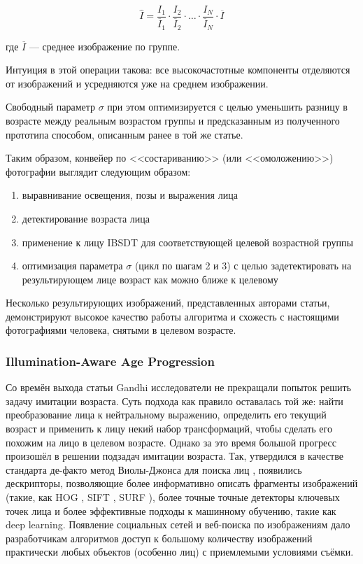 $$
\widehat{I} = \frac {I_1} {\overline{I}_1} \cdot \frac {I_2} {\overline{I}_2}  \cdot \ldots \cdot \frac {I_N} {\overline{I}_N} \cdot \overline{I}
$$

где $ \overline{I} $ --- среднее изображение по группе.

Интуиция в этой операции такова: все высокочастотные компоненты отделяются от изображений и усредняются уже на среднем изображении.

Свободный параметр $ \sigma $ при этом оптимизируется с целью уменьшить разницу в возрасте между реальным возрастом группы и предсказанным из полученного прототипа способом, описанным ранее в той же статье.

Таким образом, конвейер по <<состариванию>> (или <<омоложению>>) фотографии выглядит следующим образом:
\begin{enumerate}
	\item выравнивание освещения, позы и выражения лица
	\item детектирование возраста лица
	\item применение к лицу IBSDT для соответствующей целевой возрастной группы
	\item оптимизация параметра $ \sigma $ (цикл по шагам 2 и 3) с целью задетектировать на результирующем лице возраст как можно ближе к целевому
\end{enumerate}

Несколько результирующих изображений, представленных авторами статьи, демонстрируют высокое качество работы алгоритма и схожесть с настоящими фотографиями человека, снятыми в целевом возрасте.

\subsubsection{Illumination-Aware Age Progression}

Со времён выхода статьи Gandhi исследователи не прекращали попыток решить задачу имитации возраста. Суть подхода как правило оставалась той же: найти преобразование лица к нейтральному выражению, определить его текущий возраст и применить к лицу некий набор трансформаций, чтобы сделать его похожим на лицо в целевом возрасте. Однако за это время большой прогресс произошёл в решении подзадач имитации возраста. Так, утвердился в качестве стандарта де-факто метод Виолы-Джонса для поиска лиц \cite{viola_jones}, появились дескрипторы, позволяющие более информативно описать фрагменты изображений (такие, как HOG \cite{hog}, SIFT \cite{sift}, SURF \cite{surf}), более точные точные детекторы ключевых точек лица \cite{jsaragih} \cite{zhu_ramanan} и более эффективные подходы к машинному обучению, такие как deep learning. Появление социальных сетей и веб-поиска по изображениям дало разработчикам алгоритмов доступ к большому количеству изображений практически любых объектов (особенно лиц) с приемлемыми условиями съёмки.

